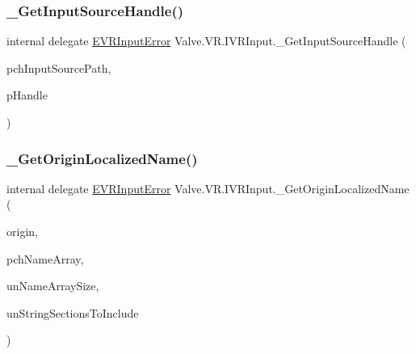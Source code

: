 \mbox{\label{struct_valve_1_1_v_r_1_1_i_v_r_input_a60fb16bdfa85d70a30f566ddd0c52fe2}} 
\subsubsection{\texorpdfstring{\_GetInputSourceHandle()}{\_GetInputSourceHandle()}}
{\footnotesize\ttfamily internal delegate \mbox{\hyperlink{namespace_valve_1_1_v_r_a592d7f4189b8346d6c96dbdbaa35bc1b}{E\+V\+R\+Input\+Error}} Valve.\+V\+R.\+I\+V\+R\+Input.\+\_\+\+Get\+Input\+Source\+Handle (\begin{DoxyParamCaption}\item[{string}]{pch\+Input\+Source\+Path,  }\item[{ref ulong}]{p\+Handle }\end{DoxyParamCaption})}

\mbox{\label{struct_valve_1_1_v_r_1_1_i_v_r_input_a17e8c670555ed63bd87786abfe4f7b1c}} 
\subsubsection{\texorpdfstring{\_GetOriginLocalizedName()}{\_GetOriginLocalizedName()}}
{\footnotesize\ttfamily internal delegate \mbox{\hyperlink{namespace_valve_1_1_v_r_a592d7f4189b8346d6c96dbdbaa35bc1b}{E\+V\+R\+Input\+Error}} Valve.\+V\+R.\+I\+V\+R\+Input.\+\_\+\+Get\+Origin\+Localized\+Name (\begin{DoxyParamCaption}\item[{ulong}]{origin,  }\item[{System.\+Text.\+String\+Builder}]{pch\+Name\+Array,  }\item[{uint}]{un\+Name\+Array\+Size,  }\item[{int}]{un\+String\+Sections\+To\+Include }\end{DoxyParamCaption})}

\mbox{\label{struct_valve_1_1_v_r_1_1_i_v_r_input_add5ead75e93d50c200dd32cfd51abb31}} 
